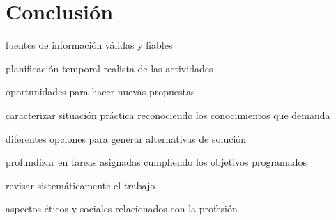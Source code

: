 \chapter{Conclusión}

fuentes de información válidas y fiables

planificación temporal realista de las actividades

oportunidades para hacer nuevas propuestas

caracterizar situación práctica reconociendo los conocimientos que demanda

diferentes opciones para generar alternativas de solución

profundizar en tareas asignadas cumpliendo los objetivos programados

revisar sistemáticamente el trabajo

aspectos éticos y sociales relacionados con la profesión

\newpage